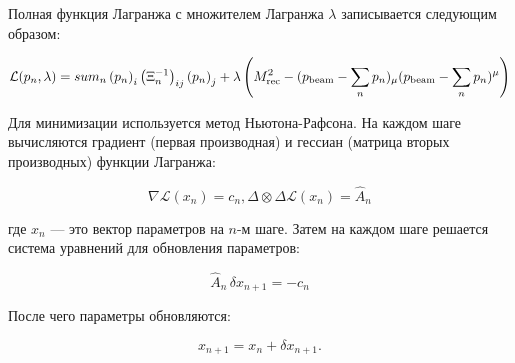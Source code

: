Полная функция Лагранжа с множителем Лагранжа $\lambda$ записывается следующим образом:

\begin{equation}
    \mathcal{L}(p_n, \lambda) = 
    sum_n \left( p_{n} \right)_i  \left( \Xi_n^{-1} \right)_{ij}  \left( p_{n} \right)_j + 
    \lambda \left( M_{\text{rec}}^2 - (p_{\text{beam}} - \sum_n p_n)_\mu (p_{\text{beam}} - \sum_n p_n)^\mu \right)
\end{equation}

Для минимизации используется метод Ньютона-Рафсона. На каждом шаге вычисляются градиент (первая производная) и гессиан (матрица вторых производных) функции Лагранжа:

\begin{equation}
    \nabla \mathcal{L}(x_n) = c_n, \Delta \otimes \Delta \mathcal{L}(x_n)  = \hat{A}_n
\end{equation}

где $x_n$ — это вектор параметров на $n$-м шаге. Затем на каждом шаге решается система уравнений для обновления параметров:

\begin{equation}
    \hat{A}_n \, \delta x_{n+1} = -c_n
\end{equation}

После чего параметры обновляются:

\begin{equation}
    x_{n+1} = x_n + \delta x_{n+1}.
\end{equation}


